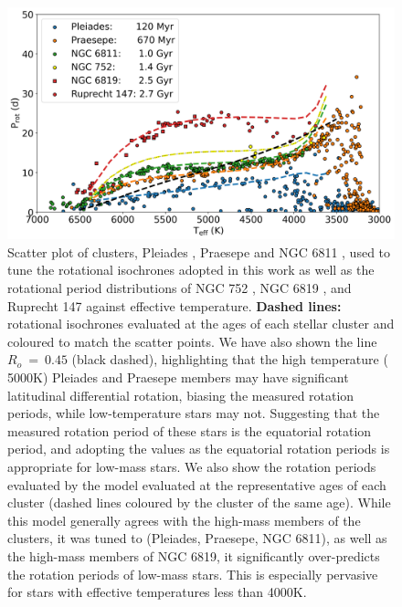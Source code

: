 \begin{figure}
\centering
 \includegraphics[width=\textwidth]{Figures/rot_gap_figures/com_gap_clus.png}
 \caption[Cluster rotation periods distributions against effective temperature.]{Scatter plot of clusters, Pleiades \citep[blue, 120 Myr;][]{rebull_rotation_2016}, Praesepe \citep[orange, 700 Myr;][]{douglas_poking_2017, douglas_k2_2019} and NGC 6811 \citep[green, 1 Gyr;]{curtis_temporary_2019}, used to tune the rotational isochrones adopted in this work \citep{spada_competing_2020} as well as the rotational period distributions of NGC 752 \citep[yellow, 1.4 Gyr;][]{agueros_new_2018}, NGC 6819 \citep[red squares, 2.5 Gyr - projected forward to 2.7 Gyr: scaled through Skumanich spin-down, for direct comparison with the Ruprecht 147 sample;][]{meibom_kepler_2011}, and Ruprecht 147 \citep[red circles, 2.7 Gyr;][]{curtis_when_2020} against effective temperature. \textbf{Dashed lines:} \citep{spada_competing_2020} rotational isochrones evaluated at the ages of each stellar cluster and coloured to match the scatter points. We have also shown the line $R_o \ = \ 0.45$ (black dashed), highlighting that the high temperature ($\>$5000K) Pleiades and Praesepe members may have significant latitudinal differential rotation, biasing the measured rotation periods, while low-temperature stars may not. Suggesting that the measured rotation period of these stars is the equatorial rotation period, and adopting the \citet{spada_competing_2020} values as the equatorial rotation periods is appropriate for low-mass stars. We also show the rotation periods evaluated by the \citet{spada_competing_2020} model evaluated at the representative ages of each cluster (dashed lines coloured by the cluster of the same age).
While this model generally agrees with the high-mass members of the clusters, it was tuned to (Pleiades, Praesepe, NGC 6811), as well as the high-mass members of NGC 6819, it significantly over-predicts the rotation periods of low-mass stars.
This is especially pervasive for stars with effective temperatures less than 4000K.}
 \label{fig:com_gap_clus}
\end{figure}

